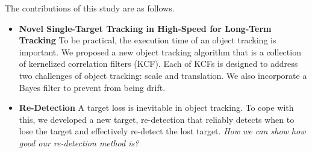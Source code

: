 \documentclass[10pt,twocolumn,letterpaper]{article}
\newcounter{ct}
\begin{document}
The contributions of this study are as follows.
\begin{itemize}

\item \textbf{Novel Single-Target Tracking in High-Speed for Long-Term
  Tracking} To be practical, the execution time of an object tracking
  is important. We proposed a new object tracking algorithm that is a
  collection of kernelized correlation filters (KCF). Each of KCFs is
  designed to address two challenges of object tracking: scale and
  translation. We also incorporate a Bayes filter to prevent from
  being drift.

\item \textbf{Re-Detection} A target loss is inevitable in object
  tracking. To cope with this, we developed a new target, re-detection
  that reliably detects when to lose the target and effectively
  re-detect the lost target. {\it How we can show how good our
    re-detection method is?}

\end{itemize}
\end{document}
